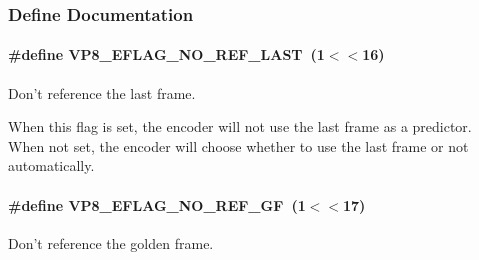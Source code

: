\subsubsection{\-Define \-Documentation}
\hypertarget{group__vp8__encoder_gafb51c67e5743275146bc1fc425727da3}{
\paragraph[{\-V\-P8\-\_\-\-E\-F\-L\-A\-G\-\_\-\-N\-O\-\_\-\-R\-E\-F\-\_\-\-L\-A\-S\-T}]{\setlength{\rightskip}{0pt plus 5cm}\#define {\bf \-V\-P8\-\_\-\-E\-F\-L\-A\-G\-\_\-\-N\-O\-\_\-\-R\-E\-F\-\_\-\-L\-A\-S\-T}~(1$<$$<$16)}}\label{group__vp8__encoder_gafb51c67e5743275146bc1fc425727da3}


\-Don't reference the last frame. 

\-When this flag is set, the encoder will not use the last frame as a predictor. \-When not set, the encoder will choose whether to use the last frame or not automatically. \hypertarget{group__vp8__encoder_gabb5e95343a2738abef44eca13059da33}{
\paragraph[{\-V\-P8\-\_\-\-E\-F\-L\-A\-G\-\_\-\-N\-O\-\_\-\-R\-E\-F\-\_\-\-G\-F}]{\setlength{\rightskip}{0pt plus 5cm}\#define {\bf \-V\-P8\-\_\-\-E\-F\-L\-A\-G\-\_\-\-N\-O\-\_\-\-R\-E\-F\-\_\-\-G\-F}~(1$<$$<$17)}}\label{group__vp8__encoder_gabb5e95343a2738abef44eca13059da33}


\-Don't reference the golden frame. 

